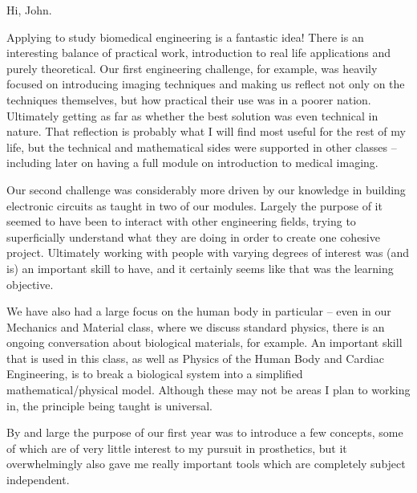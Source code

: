 Hi, John.

Applying to study biomedical engineering is a fantastic idea! There is an interesting balance of practical work, introduction to real life applications and purely theoretical. Our first engineering challenge, for example, was heavily focused on introducing imaging techniques and making us reflect not only on the techniques themselves, but how practical their use was in a poorer nation. Ultimately getting as far as whether the best solution was even technical in nature. That reflection is probably what I will find most useful for the rest of my life, but  the technical and mathematical sides were supported in other classes -- including later on having a full module on introduction to medical imaging.

Our second challenge was considerably more driven by our knowledge in building electronic circuits as taught in two of our modules. Largely the purpose of it seemed to have been to interact with other engineering fields, trying to superficially understand what they are doing in order to create one cohesive project. Ultimately working with people with varying degrees of interest was (and is) an important skill to have, and it certainly seems like that was the learning objective.

We have also had a large focus on the human body in particular -- even in our Mechanics and Material class, where we discuss standard physics, there is an ongoing conversation about biological materials, for example. An important skill that is used in this class, as well as Physics of the Human Body and Cardiac Engineering, is to break a biological system into a simplified mathematical/physical model. Although these may not be areas I plan to working in, the principle being taught is universal.

By and large the purpose of our first year was to introduce a few concepts, some of which are of very little interest to my pursuit in prosthetics, but it overwhelmingly also gave me really important tools which are completely subject independent.